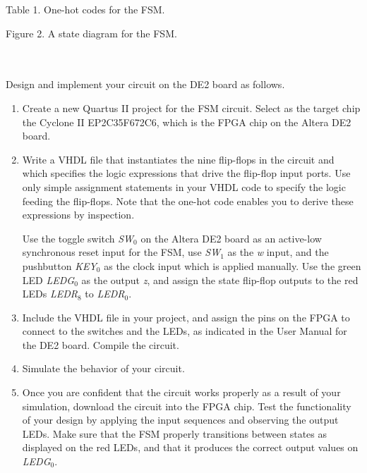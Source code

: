 \documentclass[epsfig,10pt,fullpage]{article}
\begin{document}
\begin{center}
Table 1. One-hot codes for the FSM.
\end{center}

\begin{figure}[H]
\scriptsize
\centerline{
\hbox{}}
\end{figure}
\centerline{Figure 2.  A state diagram for the FSM.}
~\\
~\\
Design and implement your circuit on the DE2 board as follows.

\begin{enumerate}
\item Create a new Quartus II project for the FSM circuit. Select as the target chip the 
Cyclone II EP2C35F672C6, which is the FPGA chip on the Altera DE2 board.

\item Write a VHDL file that instantiates the nine flip-flops in the circuit and which
specifies the logic expressions that drive the flip-flop input ports. Use only
simple assignment statements in your VHDL code to specify the logic feeding the
flip-flops. Note that the one-hot code enables you to derive these expressions by
inspection.

Use the toggle switch {\it SW}$_0$ on the Altera DE2 board as an active-low synchronous reset input
for the FSM, use {\it SW}$_1$ as the {\it w} input, and the 
pushbutton {\it KEY}$_0$ as the clock input which 
is applied manually.  Use the green LED {\it LEDG}$_0$ as the output {\it z}, 
and assign the state flip-flop outputs to the red LEDs {\it LEDR}$_8$ to {\it LEDR}$_0$.

\item Include the VHDL file in your project, and assign the pins on the FPGA to 
connect to the switches and the LEDs, as indicated in the User Manual for the DE2 board.
Compile the circuit.

\item Simulate the behavior of your circuit.

\item Once you are confident that the circuit works properly as a result of your
simulation, download the circuit into the FPGA chip.  Test the functionality of your 
design by applying the input sequences and observing the output LEDs. Make sure that the
FSM properly transitions between states as displayed on the red LEDs, and that it produces
the correct output values on {\it LEDG}$_0$.


\end{enumerate}
\end{document}
